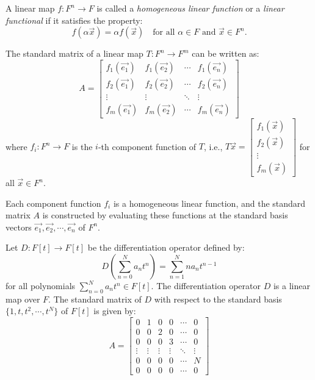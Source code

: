 \documentclass[11pt,fleqn]{book} %
\begin{document}
\begin{definition}
    A linear map $f: F^n \to F$ is called a \emph{homogeneous linear function} or a \emph{linear functional} if it satisfies the property:
    \[
        f(\alpha \vec{x}) = \alpha f(\vec{x}) \quad \text{for all } \alpha \in F \text{ and } \vec{x} \in F^n.
    \]
\end{definition}

\begin{corollary}
    The standard matrix of a linear map $T: F^n \to F^m$ can be written as:
    \[
        A = \begin{bmatrix}
            f_1(\vec{e_1}) & f_1(\vec{e_2}) & \cdots & f_1(\vec{e_n}) \\
            f_2(\vec{e_1}) & f_2(\vec{e_2}) & \cdots & f_2(\vec{e_n}) \\
            \vdots & \vdots & \ddots & \vdots \\
            f_m(\vec{e_1}) & f_m(\vec{e_2}) & \cdots & f_m(\vec{e_n})
        \end{bmatrix}
    \]
    where $f_i: F^n \to F$ is the $i$-th component function of $T$, i.e., $T\vec{x} = \begin{bmatrix}
        f_1(\vec{x}) \\
        f_2(\vec{x}) \\
        \vdots \\
        f_m(\vec{x})
    \end{bmatrix}$ for all $\vec{x} \in F^n$.
\end{corollary}

\begin{remark}
    Each component function $f_i$ is a homogeneous linear function, and the standard matrix $A$ is constructed by evaluating these functions at the standard basis vectors $\vec{e_1}, \vec{e_2}, \cdots, \vec{e_n}$ of $F^n$.
\end{remark}

\begin{example}
    Let $D: F[t] \to F[t]$ be the differentiation operator defined by:
    \[
        D\left( \sum_{n=0}^{N} a_n t^n \right) = \sum_{n=1}^{N} n a_n t^{n-1}
    \]
    for all polynomials $\sum_{n=0}^{N} a_n t^n \in F[t]$. The differentiation operator $D$ is a linear map over $F$. The standard matrix of $D$ with respect to the standard basis $\{1, t, t^2, \cdots, t^N\}$ of $F[t]$ is given by:
    \[
        A = \begin{bmatrix}
            0 & 1 & 0 & 0 & \cdots & 0 \\
            0 & 0 & 2 & 0 & \cdots & 0 \\
            0 & 0 & 0 & 3 & \cdots & 0 \\
            \vdots & \vdots & \vdots & \vdots & \ddots & \vdots \\
            0 & 0 & 0 & 0 & \cdots & N \\
            0 & 0 & 0 & 0 & \cdots & 0
        \end{bmatrix}
    \]
\end{example}
\end{document}
